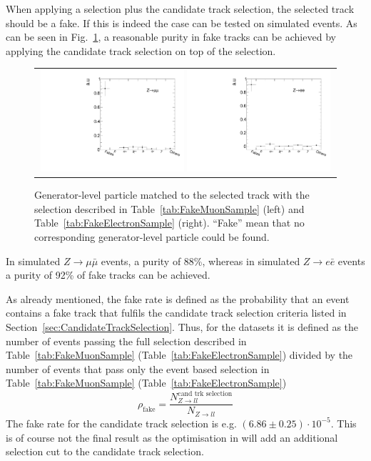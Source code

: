 When applying a \Zlep selection plus the candidate track selection, the selected track should be a fake.
If this is indeed the case can be tested on simulated \Zlep events.
As can be seen in Fig.~\ref{fig:BkgComposition}, a reasonable purity in fake tracks can be achieved by applying the candidate track selection on top of the \Zlep selection.
\begin{figure}[!b]
  \centering 
  \begin{tabular}{c}
    \includegraphics[width=0.49\textwidth]{figures/analysis/Background/ParticleCompositionInFakeCS_Mu.pdf}
    \includegraphics[width=0.49\textwidth]{figures/analysis/Background/ParticleCompositionInFakeCS_Ele.pdf}
  \end{tabular}
  \caption{Generator-level particle matched to the selected track with the selection described in Table~\ref{tab:FakeMuonSample} (left) and Table~\ref{tab:FakeElectronSample} (right). ``Fake'' mean that no corresponding generator-level particle could be found. }
  \label{fig:BkgComposition}
\end{figure}
In simulated $Z\rightarrow\mu\bar{\mu}$ events, a purity of 88\%, whereas in simulated $Z\rightarrow e\bar{e}$ events a purity of 92\% of fake tracks can be achieved.


As already mentioned, the fake rate is defined as the probability that an event contains a fake track that fulfils the candidate track selection criteria listed in Section~\ref{sec:CandidateTrackSelection}.
Thus, for the \Zlep datasets it is defined as the number of events passing the full selection described in Table~\ref{tab:FakeMuonSample} (Table~\ref{tab:FakeElectronSample}) divided by the number of events that pass only the event based selection in Table~\ref{tab:FakeMuonSample} (Table~\ref{tab:FakeElectronSample})
\begin{equation*}
\rho_{\text{fake}} = \frac{N_{Z\rightarrow ll}^{\text{cand trk selection}}}{N_{Z\rightarrow ll}}
\end{equation*}
The fake rate for the candidate track selection is e.g. $\left( 6.86 \pm 0.25 \right) \cdot 10^{-5}$. 
This is of course not the final result as the optimisation in \pt will add an additional \pt selection cut to the candidate track selection.

